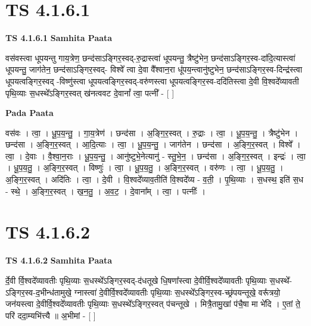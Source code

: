 \documentclass[17pt]{extarticle}
\begin{document}

\section{ TS 4.1.6.1 }

\textbf{TS 4.1.6.1 } \newline
\textbf{Samhita Paata} \newline

वस॑वस्त्वा धूपयन्तु गाय॒त्रेण॒ छन्द॑साऽङ्गिर॒स्वद्-रु॒द्रास्त्वा॑ धूपयन्तु॒ त्रैष्टु॑भेन॒ छन्द॑साऽङ्गिर॒स्व-दा॑दि॒त्यास्त्वा॑ धूपयन्तु॒ जाग॑तेन॒ छन्द॑साऽङ्गिर॒स्वद्- विश्वे᳚ त्वा दे॒वा वै᳚श्वान॒रा धू॑पय॒न्त्वानु॑ष्टुभेन॒ छन्द॑साऽङ्गिर॒स्व-दिन्द्र॑स्त्वा धूपयत्वङ्गिर॒स्वद् -विष्णु॑स्त्वा धूपयत्वङ्गिर॒स्वद्-वरु॑णस्त्वा धूपयत्वङ्गिर॒स्व-ददि॑तिस्त्वा दे॒वी वि॒श्वदे᳚व्यावती पृथि॒व्याः स॒धस्थे᳚ऽङ्गिर॒स्वत् ख॑नत्ववट दे॒वानां᳚ त्वा॒ पत्नी᳚ - [  ] \newline

\textbf{Pada Paata} \newline

वस॑वः । त्वा॒ । धू॒प॒य॒न्तु॒ । गा॒य॒त्रेण॑ । छन्द॑सा । अ॒ङ्गि॒र॒स्वत् । रु॒द्राः । त्वा॒ । धू॒प॒य॒न्तु॒ । त्रैष्टु॑भेन । छन्द॑सा । अ॒ङ्गि॒र॒स्वत् । आ॒दि॒त्याः । त्वा॒ । धू॒प॒य॒न्तु॒ । जाग॑तेन । छन्द॑सा । अ॒ङ्गि॒र॒स्वत् । विश्वे᳚ । त्वा॒ । दे॒वाः । वै॒श्वा॒न॒राः । धू॒प॒य॒न्तु॒ । आनु॑ष्टुभे॒नेत्यानु॑ - स्तु॒भे॒न॒ । छन्द॑सा । अ॒ङ्गि॒र॒स्वत् । इन्द्रः॑ । त्वा॒ । धू॒प॒य॒तु॒ । अ॒ङ्गि॒र॒स्वत् । विष्णुः॑ । त्वा॒ । धू॒प॒य॒तु॒ । अ॒ङ्गि॒र॒स्वत् । वरु॑णः । त्वा॒ । धू॒प॒य॒तु॒ । अ॒ङ्गि॒र॒स्वत् । अदि॑तिः । त्वा॒ । दे॒वी । वि॒श्वदे᳚व्याव॒तीति॑ वि॒श्वदे᳚व्य - व॒ती॒ । पृ॒थि॒व्याः । स॒धस्थ॒ इति॑ स॒ध - स्थे॒ । अ॒ङ्गि॒र॒स्वत् । ख॒न॒तु॒ । अ॒व॒ट॒ । दे॒वाना᳚म् । त्वा॒ । पत्नीः᳚ ।  \newline





\section{ TS 4.1.6.2 }

\textbf{TS 4.1.6.2 } \newline
\textbf{Samhita Paata} \newline

र्दे॒वी र्वि॒श्वदे᳚व्यावतीः पृथि॒व्याः स॒धस्थे᳚ऽङ्गिर॒स्वद्-द॑धतूखे धि॒षणा᳚स्त्वा दे॒वीर्वि॒श्वदे᳚व्यावतीः पृथि॒व्याः स॒धस्थे᳚-ऽङ्गिर॒स्व-द॒भीन्ध॑तामुखे॒ ग्नास्त्वा॑ दे॒वीर्वि॒श्वदे᳚व्यावतीः पृथि॒व्याः स॒धस्थे᳚ऽङ्गिर॒स्व-च्छ्र॑पयन्तूखे॒ वरू᳚त्रयो॒ जन॑यस्त्वा दे॒वीर्वि॒श्वदे᳚व्यावतीः पृथि॒व्याः स॒धस्थे᳚ऽङ्गिर॒स्वत् प॑चन्तूखे । मित्रै॒तामु॒खां प॑चै॒षा मा भे॑दि । ए॒तां ते॒ परि॑ ददा॒म्यभि॑त्त्यै ॥ अ॒भीमां - [  ] \newline
\end{document}
